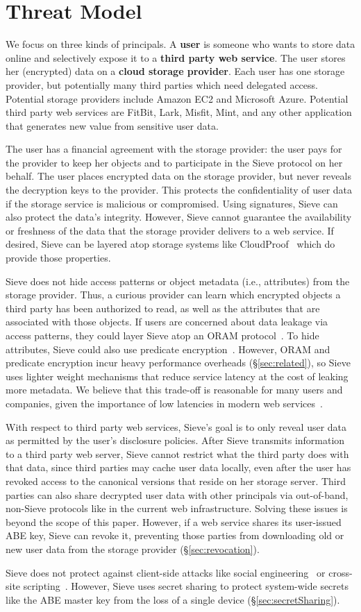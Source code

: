 \chapter{Threat Model}
\label{sec:threatModel}

We focus on three kinds of principals. A
\textbf{user} is someone who wants to store
data online and selectively expose it
to a \textbf{third party web service}. The
user stores her (encrypted) data on a
\textbf{cloud storage provider}. Each
user has one storage provider, but
potentially many third parties which
need delegated access. Potential storage
providers include Amazon EC2 and Microsoft
Azure. Potential third party web services
are FitBit, Lark, Misfit, Mint, and 
any other application that generates new value
from sensitive user data.

The user has a financial agreement with
the storage provider: the user pays for the provider 
to keep her objects and to participate in the
Sieve protocol on her behalf.
The user places encrypted data on the
storage provider, but never reveals
the decryption keys to the provider. 
This protects the confidentiality of
user data if the storage service is
malicious or compromised. Using signatures,
Sieve can also protect the data's
integrity. However, Sieve cannot
guarantee the availability or freshness
of the data that the storage provider
delivers to a web service. If desired,
Sieve can be layered atop storage
systems like CloudProof~\cite{cloudproof}
which do provide those properties.

Sieve does not hide access patterns
or object metadata (i.e., attributes) from
the storage provider. Thus, a curious
provider can learn which encrypted
objects a third party has been authorized
to read, as well as the attributes
that are associated with those objects.
If users are concerned about data
leakage via access patterns, they
could layer Sieve atop an ORAM
protocol~\cite{shroud}. To hide attributes,
Sieve could also use predicate encryption~\cite{katz2008,shen2009}.
However, ORAM and predicate encryption
incur heavy performance overheads
(\S\ref{sec:related}), so Sieve uses
lighter weight mechanisms that reduce
service latency at the cost of leaking
more metadata. We believe that this
trade-off is reasonable for many users
and companies, given the importance
of low latencies in modern web services~\cite{wprof,bobtail}.

With respect to third party web services,
Sieve's goal is to only reveal user data
as permitted by the user's disclosure
policies. After Sieve transmits information
to a third party web server, Sieve cannot
restrict what the third party does with that
data, since third parties may cache user data
locally, even after the user has revoked access
to the canonical versions that reside on her
storage server. Third parties can also share 
decrypted user data with other
principals via out-of-band, non-Sieve protocols
like in the current web infrastructure.
Solving these issues is beyond the scope of
this paper. However, if a web service shares its user-issued
ABE key, Sieve can revoke it, preventing
those parties from downloading old or new
user data from the storage provider
(\S\ref{sec:revocation}).

Sieve does not protect against client-side
attacks like social engineering~\cite{socialEngineering}
or cross-site scripting~\cite{xss}.
However, Sieve uses secret sharing to
protect system-wide secrets like the ABE
master key from the loss of a single device
(\S\ref{sec:secretSharing}).
